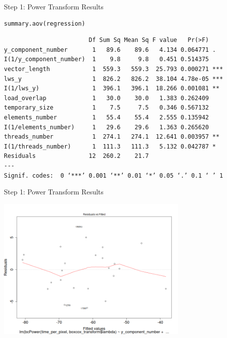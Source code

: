 \documentclass[10pt, compress, aspectratio=169, xcolor={table,usenames,dvipsnames}]{beamer}
\begin{document}
\begin{frame}[fragile,label={sec:org6ae311c}]{Step 1: Power Transform Results}
 \scriptsize
\lstset{language=r,label= ,caption= ,captionpos=b,numbers=none}
\begin{lstlisting}
summary.aov(regression)
\end{lstlisting}

\begin{verbatim}
                        Df Sum Sq Mean Sq F value   Pr(>F)
y_component_number       1   89.6    89.6   4.134 0.064771 .
I(1/y_component_number)  1    9.8     9.8   0.451 0.514375
vector_length            1  559.3   559.3  25.793 0.000271 ***
lws_y                    1  826.2   826.2  38.104 4.78e-05 ***
I(1/lws_y)               1  396.1   396.1  18.266 0.001081 **
load_overlap             1   30.0    30.0   1.383 0.262409
temporary_size           1    7.5     7.5   0.346 0.567132
elements_number          1   55.4    55.4   2.555 0.135942
I(1/elements_number)     1   29.6    29.6   1.363 0.265620
threads_number           1  274.1   274.1  12.641 0.003957 **
I(1/threads_number)      1  111.3   111.3   5.132 0.042787 *
Residuals               12  260.2    21.7
---
Signif. codes:  0 ‘***’ 0.001 ‘**’ 0.01 ‘*’ 0.05 ‘.’ 0.1 ‘ ’ 1
\end{verbatim}

\normalsize
\end{frame}
\begin{frame}[label={sec:orge0d8def}]{Step 1: Power Transform Results}
\begin{center}
\includegraphics[width=0.7\textwidth]{../img/regression_after_transform.png}
\end{center}
\end{frame}
\end{document}
